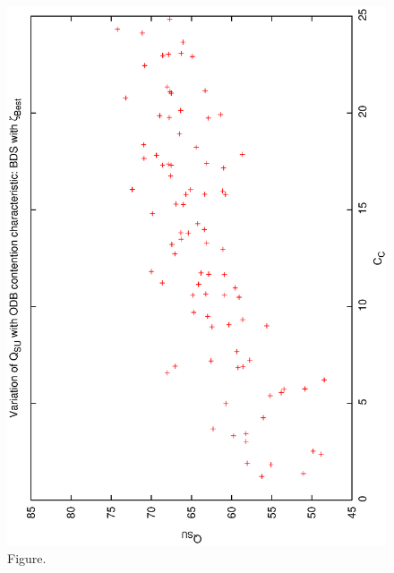 \documentclass[12pt,a4paper]{article}
\begin{document}
\begin{figure}[htbp]
 \begin{center}
  \includegraphics[scale=1.0, angle=0]{figures/qsucc_best.eps}
 \end{center}
  \caption[Figure.]
{Figure.}
\end{figure}
\clearpage
\end{document}
